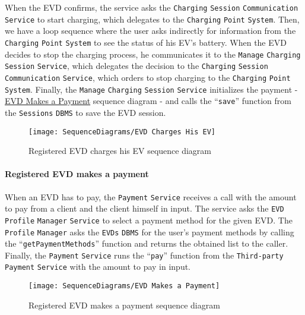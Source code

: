 When the EVD confirms, the service asks the \verb|Charging| \verb|Session| \verb|Communication| \verb|Service| to start charging, which delegates to the \verb|Charging| \verb|Point| \verb|System|.
Then, we have a loop sequence where the user asks indirectly for information from the \verb|Charging| \verb|Point| \verb|System| to see the status of his EV's battery.
When the EVD decides to stop the charging process, he communicates it to the \verb|Manage| \verb|Charging| \verb|Session| \verb|Service|, which delegates the decision to the \verb|Charging| \verb|Session| \verb|Communication| \verb|Service|, which orders to stop charging to the \verb|Charging| \verb|Point| \verb|System|.
Finally, the \verb|Manage| \verb|Charging| \verb|Session| \verb|Service| initializes the payment - \hyperlink{evdmakespayment}{EVD Makes a Payment} sequence diagram - and calls the ``\verb|save|'' function from the \verb|Sessions| \verb|DBMS| to save the EVD session.
\begin{figure}[H]
    \begin{center}
        \texttt{[image: SequenceDiagrams/EVD Charges His EV]}
        \caption{Registered EVD charges his EV sequence diagram}
        \label{fig:evd_charges_his_ev}
    \end{center}
\end{figure}

\paragraph{\texorpdfstring{\protect\hypertarget{evdmakespayment}{Registered EVD makes a payment}}{}}
When an EVD has to pay, the \verb|Payment| \verb|Service| receives a call with the amount to pay from a client and the client himself in input.
The service asks the \verb|EVD| \verb|Profile| \verb|Manager| \verb|Service| to select a payment method for the given EVD\@.
The \verb|Profile| \verb|Manager| asks the \verb|EVDs| \verb|DBMS| for the user's payment methods by calling the ``\verb|getPaymentMethods|'' function and returns the obtained list to the caller.
Finally, the \verb|Payment| \verb|Service| runs the ``\verb|pay|'' function from the \verb|Third-party| \verb|Payment| \verb|Service| with the amount to pay in input.
\begin{figure}[H]
    \begin{center}
        \texttt{[image: SequenceDiagrams/EVD Makes a Payment]}
        \caption{Registered EVD makes a payment sequence diagram}
        \label{fig:evd_makes_payment}
    \end{center}
\end{figure}

